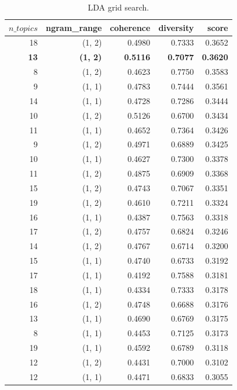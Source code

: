 \documentclass{article}
\begin{document}
\begin{table}[htbp]
\begin{minipage}{0.42\textwidth}
\begin{tabular}{rrrrr}
\hline
$n\_topics$ & ngram\_range & coherence & diversity & score \\
\hline
18 & (1, 2) & 0.4980 & 0.7333 & 0.3652 \\
\textbf{13} & \textbf{(1, 2)} & \textbf{0.5116} & \textbf{0.7077} & \textbf{0.3620} \\
8  & (1, 2) & 0.4623 & 0.7750 & 0.3583 \\
9  & (1, 1) & 0.4783 & 0.7444 & 0.3561 \\
14 & (1, 1) & 0.4728 & 0.7286 & 0.3444 \\
10 & (1, 2) & 0.5126 & 0.6700 & 0.3434 \\
11 & (1, 1) & 0.4652 & 0.7364 & 0.3426 \\
9  & (1, 2) & 0.4971 & 0.6889 & 0.3425 \\
10 & (1, 1) & 0.4627 & 0.7300 & 0.3378 \\
11 & (1, 2) & 0.4875 & 0.6909 & 0.3368 \\
15 & (1, 2) & 0.4743 & 0.7067 & 0.3351 \\
19 & (1, 2) & 0.4610 & 0.7211 & 0.3324 \\
16 & (1, 1) & 0.4387 & 0.7563 & 0.3318 \\
17 & (1, 2) & 0.4757 & 0.6824 & 0.3246 \\
14 & (1, 2) & 0.4767 & 0.6714 & 0.3200 \\
15 & (1, 1) & 0.4740 & 0.6733 & 0.3192 \\
17 & (1, 1) & 0.4192 & 0.7588 & 0.3181 \\
18 & (1, 1) & 0.4334 & 0.7333 & 0.3178 \\
16 & (1, 2) & 0.4748 & 0.6688 & 0.3176 \\
13 & (1, 1) & 0.4690 & 0.6769 & 0.3175 \\
8  & (1, 1) & 0.4453 & 0.7125 & 0.3173 \\
19 & (1, 1) & 0.4592 & 0.6789 & 0.3118 \\
12 & (1, 2) & 0.4431 & 0.7000 & 0.3102 \\
12 & (1, 1) & 0.4471 & 0.6833 & 0.3055 \\
\hline
\end{tabular}
\caption{LDA grid search.}
\label{tab:lda_grid}
\end{minipage}
\end{table}

\newpage

\newpage

\end{document}
